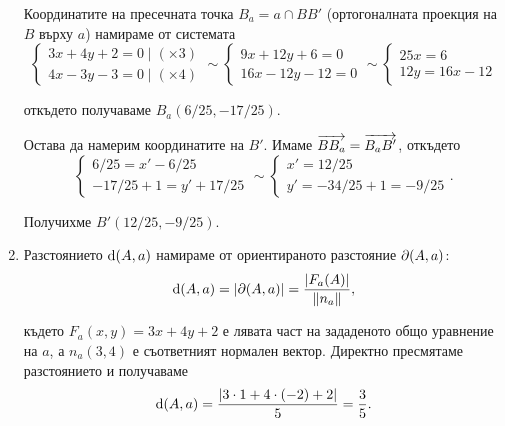 \documentclass[numbers=endperiod, DIV=15]{scrartcl}
\begin{document}
\begin{solution}
\begin{enumerate}[label=\alph*)]
    Координатите на пресечната точка $B_a = a \cap BB'$ (ортогоналната проекция на $B$ върху $a$) намираме от системата
    \begin{displaymath}
      \begin{cases}
        3x + 4y + 2 = 0 \mid (\times 3) \\
        4x - 3y - 3 = 0 \mid (\times 4)
      \end{cases}
      \sim
      \begin{cases}
        9x + 12y + 6 = 0 \\
        16x - 12y - 12 = 0
      \end{cases}
      \sim
      \begin{cases}
        25x = 6 \\
        12y = 16x - 12
      \end{cases}
    \end{displaymath}

    откъдето получаваме $B_a(6/25, -17/25)$.

    Остава да намерим координатите на $B'$. Имаме $\overrightarrow{BB_a} = \overrightarrow{B_a B'}$, откъдето
    \begin{displaymath}
      \begin{cases}
        6/25 = x' - 6/25 \\
        -17/25 + 1 = y' + 17/25
      \end{cases}
      \sim
      \begin{cases}
        x' = 12/25 \\
        y' = -34/25 + 1 = -9/25
      \end{cases}.
    \end{displaymath}

    Получихме $B'(12/25, -9/25)$.

    \item Разстоянието $\operatorname{d}(A, a)$ намираме от ориентираното разстояние $\partial(A, a)$:
    \begin{displaymath}
      \operatorname{d}(A, a) = \left\vert \partial(A, a) \right\vert = \frac {\left\vert F_a(A) \right\vert} {\left\Vert n_a \right\Vert},
    \end{displaymath}

    където $F_a(x, y) = 3x + 4y + 2$ е лявата част на зададеното общо уравнение на $a$, а $n_a(3, 4)$ е съответният нормален вектор. Директно пресмятаме разстоянието и получаваме
    \begin{displaymath}
      \operatorname{d}(A, a) = \frac {\left\vert 3 \cdot 1 + 4 \cdot (-2) + 2 \right\vert} 5 = \frac 3 5.
    \end{displaymath}


\end{enumerate}
\end{solution}
\end{document}

